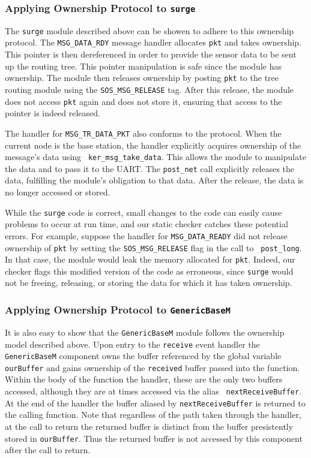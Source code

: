 \subsubsection{Applying Ownership Protocol to {\tt surge}}

The {\tt surge} module described above can be showen to adhere to this
ownership protocol.  The {\tt MSG\_DATA\_RDY} message handler
allocates {\tt pkt} and takes ownership. This pointer is then
dereferenced in order to provide the sensor data to be sent up the
routing tree.  This pointer manipulation is safe since the module has
ownership.  The module then releases ownership by posting {\tt pkt} to
the tree routing module using the {\tt SOS\_MSG\_RELEASE} tag.  After
this release, the module does not access {\tt pkt} again and does not
store it, ensuring that access to the pointer is indeed released. 

The handler for {\tt MSG\_TR\_DATA\_PKT} also conforms to the
protocol.   When the current node is the base station, the handler
explicitly acquires ownership of the message's data using {\tt
ker\_msg\_take\_data}.  This allows the module to manipulate the data
and to pass it to the UART.  The {\tt post\_net} call explicitly
releases the data, fulfilling the module's obligation to that data.
After the release, the data is no longer accessed or stored.

While the {\tt surge} code is correct, small changes to the code can
easily cause problems to occur at run time, and our static checker
catches these potential errors.  For example, suppose the handler for
{\tt MSG\_DATA\_READY} did not release ownership of {\tt pkt} by
setting the {\tt SOS\_MSG\_RELEASE} flag in the call to {\tt
post\_long}.  In that case, the module would leak the memory allocated
for {\tt pkt}.  Indeed, our checker flags this modified version of the
code as erroneous, since {\tt surge} would not be freeing, releasing,
or storing the data for which it has taken ownership.


\subsubsection{Applying Ownership Protocol to {\tt GenericBaseM}}

It is also easy to show that the {\tt GenericBaseM} module follows the
ownership model described above.  Upon entry to the {\tt receive}
event handler the {\tt GenericBaseM} component owns the buffer
referenced by the global variable {\tt ourBuffer} and gains ownership
of the {\tt received} buffer passed into the function.  Within the
body of the function the handler, these are the only two buffers
accessed, although they are at times accessed via the alias {\tt
nextReceiveBuffer}.  At the end of the handler the buffer aliased by
{\tt nextReceiveBuffer} is returned to the calling function.  Note
that regardless of the path taken through the handler, at the call to
return the returned buffer is distinct from the buffer presistently
stored in {\tt ourBuffer}.  Thus the returned buffer is not accessed
by this component after the call to return.


